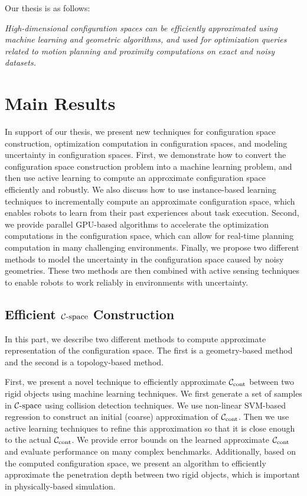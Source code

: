 Our thesis is as follows:

\textit{High-dimensional configuration spaces can be efficiently approximated using machine learning and geometric algorithms, and used for optimization queries related to motion planning and proximity computations on exact and noisy datasets.}

\section{Main Results}
In support of our thesis, we present new techniques for configuration space construction, optimization computation in configuration spaces, and modeling uncertainty in configuration spaces. First, we demonstrate how to convert the configuration space construction problem into a machine learning problem, and then use active learning to compute an approximate configuration space efficiently and robustly. We also discuss how to use instance-based learning techniques to incrementally compute an approximate configuration space, which enables robots to learn from their past experiences about task execution. Second, we provide parallel GPU-based algorithms to accelerate the optimization computations in the configuration space, which can allow for real-time planning computation in many challenging environments. Finally, we propose two different methods to model the uncertainty in the configuration space caused by noisy geometries. These two methods are then combined with active sensing techniques to enable robots to work reliably in environments with uncertainty.

\subsection{Efficient $\mathcal C\text{-space}$ Construction}
In this part, we describe two different methods to compute approximate representation of the configuration space. The first is a geometry-based method and the second is a topology-based method.

First, we present a novel technique to efficiently approximate $\mathcal C_\text{cont}$ between two rigid objects using machine learning techniques. We first generate a set of samples in $\mathcal C\text{-space}$ using collision detection techniques. We use non-linear SVM-based regression to construct an initial (coarse) approximation of $\mathcal C_\text{cont}$. Then we use active learning techniques to refine this approximation so that it is close enough to the actual $\mathcal C_\text{cont}$. We provide error bounds on the learned approximate $\mathcal C_\text{cont}$ and evaluate performance on many complex benchmarks. Additionally, based on the computed configuration space, we present an algorithm to efficiently approximate the penetration depth between two rigid objects, which is important in physically-based simulation.

